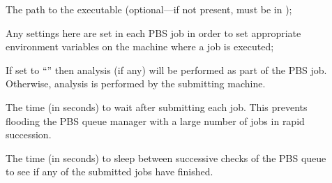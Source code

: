 \begin{description}
\begin{description}
\item[] The path to the  executable (optional---if not present,  must be in );
\item[] Any settings here are set in each {\normalfont \scshape PBS} job in order to set appropriate environment variables on the machine where a job is executed;
\item[] If set to ``'' then analysis (if any) will be performed as part of the PBS job. Otherwise, analysis is performed by the submitting machine.
\item[] The time (in seconds) to wait after submitting each job. This prevents flooding the PBS queue manager with a large number of jobs in rapid succession.
\item[] The time (in seconds) to sleep between successive checks of the PBS queue to see if any of the submitted jobs have finished.
\end{description}


\end{description}
